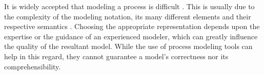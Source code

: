 \documentclass[a4paper,twoside]{article}
\begin{document}

It is widely accepted that modeling a process is difficult \cite{7PMG}. This is usually due to the complexity of the modeling notation, its many different elements and their respective semantics \cite{What we can learn from Quality Issues of BPMN Models from Industry}. Choosing the appropriate representation depends upon the expertise or the guidance of an experienced modeler, which can greatly influence the quality of the resultant model. While the use of process modeling tools can help in this regard, they cannot guarantee a model's correctness nor its comprehensibility.


\end{document}
